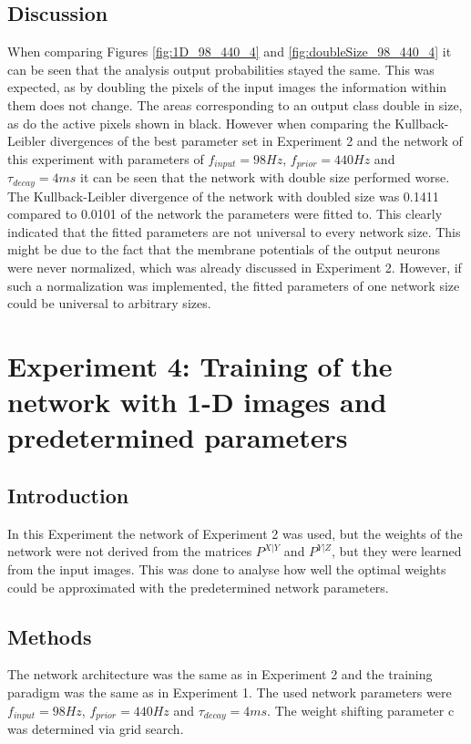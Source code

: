 \subsection{Discussion}

When comparing Figures \ref{fig:1D_98_440_4} and \ref{fig:doubleSize_98_440_4} it can be seen that the analysis output probabilities stayed the same. This was expected, as by doubling the pixels of the input images the information within them does not change. The areas corresponding to an output class double in size, as do the active pixels shown in black. However when comparing the Kullback-Leibler divergences of the best parameter set in Experiment 2 and the network of this experiment with parameters of $f_{input} = 98 Hz$, $f_{prior} = 440 Hz$ and $\tau_{decay} = 4 ms$ it can be seen that the network with double size performed worse. The Kullback-Leibler divergence of the network with doubled size was 0.1411 compared to 0.0101 of the network the parameters were fitted to. This clearly indicated that the fitted parameters are not universal to every network size. This might be due to the fact that the membrane potentials of the output neurons were never normalized, which was already discussed in Experiment 2. However, if such a normalization was implemented, the fitted parameters of one network size could be universal to arbitrary sizes.

\section{Experiment 4: Training of the network with 1-D images and predetermined parameters}
\label{section:1DPreDetermined}

\subsection{Introduction}

In this Experiment the network of Experiment 2 was used, but the weights of the network were not derived from the matrices $P^{X|Y}$ and $P^{Y|Z}$, but they were learned from the input images. This was done to analyse how well the optimal weights could be approximated with the predetermined network parameters.

\subsection{Methods}

The network architecture was the same as in Experiment 2 and the training paradigm was the same as in Experiment 1. The used network parameters were $f_{input} = 98 Hz$, $f_{prior} = 440 Hz$ and $\tau_{decay} = 4 ms$. The weight shifting parameter c was determined via grid search.
